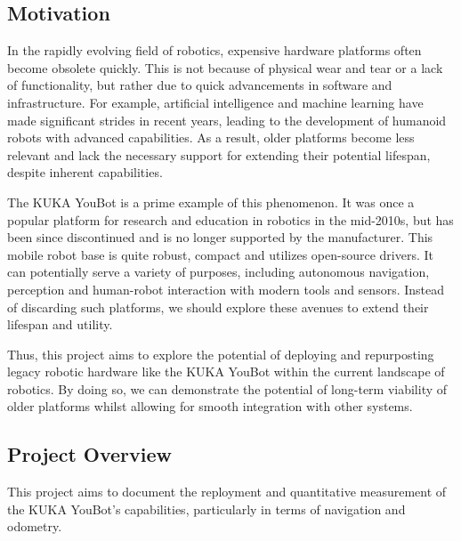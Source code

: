 \documentclass[a4paper, 12pt]{article}
\newif\ifshowadi
\newcommand{\adi}[1]{\ifshowadi\textcolor{red}{#1}\fi}
\newif\ifshownotes
\newcommand{\notes}[1]{\ifshownotes\textcolor{blue}{#1}\fi}
\begin{document}
    \subsection{Motivation}

    In the rapidly evolving field of robotics, expensive hardware platforms often become obsolete quickly. This is not because of physical wear and tear or a lack of functionality, but rather due to quick advancements in software and infrastructure. For example, artificial intelligence and machine learning have made significant strides in recent years, leading to the development of humanoid robots with advanced capabilities. As a result, older platforms become less relevant and lack the necessary support for extending their potential lifespan, despite inherent capabilities. 

    The KUKA YouBot is a prime example of this phenomenon. It was once a popular platform for research and education in robotics in the mid-2010s, but has been since discontinued and is no longer supported by the manufacturer. This mobile robot base is quite robust, compact and utilizes open-source drivers. It can potentially serve a variety of purposes, including autonomous navigation, perception and human-robot interaction with modern tools and sensors. Instead of discarding such platforms, we should explore these avenues to extend their lifespan and utility. 
    
    Thus, this project aims to explore the potential of deploying and repurposting legacy robotic hardware like the KUKA YouBot within the current landscape of robotics. By doing so, we can demonstrate the potential of long-term viability of older platforms whilst allowing for smooth integration with other systems. 

    \subsection{Project Overview}

    This project aims to document the reployment and quantitative measurement of the KUKA YouBot's capabilities, particularly in terms of navigation and odometry. 
    
\end{document}
